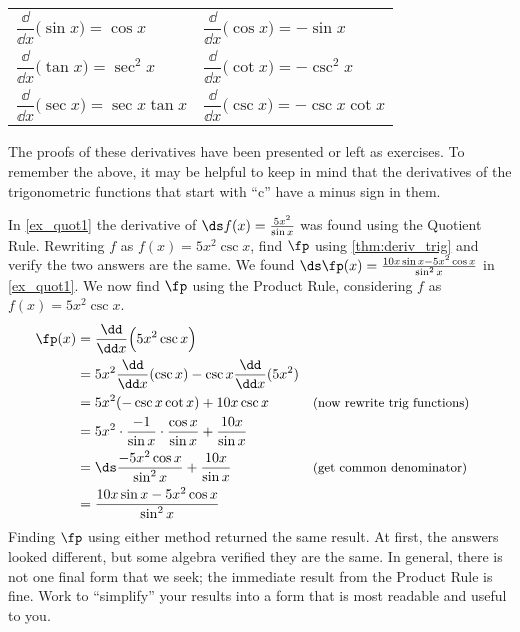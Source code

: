 \begin{theorem}\label{thm:deriv_trig}
\begin{anywhereenum}
\renewcommand{\arraystretch}{2.2}
	\begin{tabular}{ll}
		\item	$\dfrac{\dd}{\dd x}\bigl(\sin x\bigr) = \cos x$ &
		\item	$\dfrac{\dd}{\dd x}\bigl(\cos x\bigr) = -\sin x$ \\
		\item	$\dfrac{\dd}{\dd x}\bigl(\tan x\bigr) = \sec^2 x$ \qquad\quad\null&
		\item	$\dfrac{\dd}{\dd x}\bigl(\cot x\bigr) = -\csc^2 x$ \\
		\item	$\dfrac{\dd}{\dd x}\bigl(\sec x\bigr) = \sec x\tan x$ &
		\item	$\dfrac{\dd}{\dd x}\bigl(\csc x\bigr) = -\csc x\cot x$
	\end{tabular}
\end{anywhereenum}
\end{theorem}

The proofs of these derivatives have been presented or left as exercises. To remember the above, it may be helpful to keep in mind that the derivatives of the trigonometric functions that start with ``c'' have a minus sign in them.

\begin{example}\label{ex_prod_quot}
In \autoref{ex_quot1} the derivative of $\ds f(x) = \frac{5x^2}{\sin x}$ was found using the Quotient Rule. Rewriting $f$ as $f(x) = 5x^2\csc x$, find $\fp$ using \autoref{thm:deriv_trig} and verify the two answers are the same.
\solution
We found $\ds \fp(x) = \frac{10x\sin x - 5x^2\cos x}{\sin^2 x}$ in \autoref{ex_quot1}. We now find $\fp$ using the Product Rule, considering $f$ as $f(x) = 5x^2\csc x$.
\begin{align*}
	\fp(x)
	&= \frac{\dd}{\dd x}\Bigl(5x^2\csc x\Bigr) \\
	& = 5x^2 \frac{\dd}{\dd x} (\csc x) - \csc x \frac{\dd}{\dd x}(5x^2) \\
	&= 5x^2(-\csc x\cot x) + 10x\csc x && \text{\small (now rewrite trig functions)}\\
	&= 5x^2\cdot \frac{-1}{\sin x}\cdot \frac{\cos x}{\sin x} + \frac{10x}{\sin x}\\
	&= \ds\frac{-5x^2\cos x}{\sin ^2x}+\frac{10x}{\sin x} && \text{\small (get common denominator)}\\
	&= \frac{10x\sin x - 5x^2\cos x}{\sin^2x}
\end{align*}
Finding $\fp$ using either method returned the same result. At first, the answers looked different, but some algebra verified they are the same. In general, there is not one final form that we seek; the immediate result from the Product Rule is fine. Work to ``simplify\primeskip'' your results into a form that is most readable and useful to you.
\end{example}

